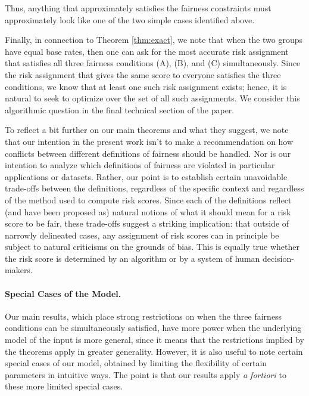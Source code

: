 \documentclass[11pt]{article}
\newcommand{\xhdr}[1]{\vspace{-0.2in} \paragraph*{\bf {#1}.}}
\begin{document}
Thus, anything that approximately satisfies the fairness constraints
must approximately look like one of the two simple cases identified above.

Finally, in connection to Theorem \ref{thm:exact}, we note that
when the two groups have equal base rates, then one can ask for
the most accurate risk assignment that satisfies all three fairness
conditions (A), (B), and (C) simultaneously.
Since the risk assignment that gives the same score to everyone satisfies
the three conditions, we know that at least one such risk assignment exists;
hence, it is natural to seek to optimize over the set of all such assignments.
We consider this algorithmic question in the final technical section of
the paper.

To reflect a bit further on our main theorems and what they suggest,
we note that our intention in the present work
isn't to make a recommendation on how conflicts
between different definitions of fairness should be handled.
Nor is our intention to analyze which definitions of
fairness are violated in particular applications or datasets.
Rather, our point is to establish certain unavoidable trade-offs
between the definitions, regardless of the specific context
and regardless of the method used to compute risk scores.
Since each of the definitions reflect (and have been proposed as) natural
notions of what it should mean for a risk score to be fair,
these trade-offs suggest a striking implication:
that outside of narrowly delineated cases,
any assignment of risk scores can in principle be subject to
natural criticisms on the grounds of bias.
This is equally true whether the risk score is determined by an algorithm
or by a system of human decision-makers.

\xhdr{Special Cases of the Model}
Our main results, which place strong restrictions on
when the three fairness conditions can be simultaneously satisfied,
have more power when the underlying model of the input
is more general, since it means that the restrictions implied by the
theorems apply in greater generality.
However, it is also useful to note certain special cases of our model,
obtained by limiting the flexibility of certain parameters in 
intuitive ways.
The point is that our results apply {\em a fortiori} 
to these more limited special cases.
\end{document}
